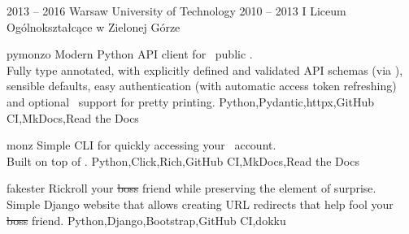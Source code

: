 \documentclass[localFont,alternative,10pt]{yaac-another-awesome-cv}
\begin{document}

  \begin{scholarship}
    \scholarshipentry
      {2013 – 2016}
      {Warsaw University of Technology}
    \scholarshipentry
      {2010 – 2013}
      {I Liceum Ogólnokształcące w Zielonej Górze}
  \end{scholarship}

  \vspace{0.5em}


  \begin{projects}
    \project
      {pymonzo}{}
      { }
      {
        Modern Python API client for ~public . \\
        Fully type annotated, with explicitly defined and validated API schemas (via ),
        sensible defaults, easy authentication (with automatic access token refreshing)
        and optional ~support for pretty printing.
      }
      {Python,Pydantic,httpx,GitHub CI,MkDocs,Read the Docs}

    \project
      {monz}{}
      { }
      {
        Simple CLI for quickly accessing your ~account. \\
        Built on top of .
      }
      {Python,Click,Rich,GitHub CI,MkDocs,Read the Docs}

    \project
      {fakester}{}
      { }
      {
        Rickroll your \sout{boss} friend while preserving the element of surprise. \\
        Simple Django website that allows creating URL redirects that help fool your \sout{boss} friend.
      }
      {Python,Django,Bootstrap,GitHub CI,dokku}
  \end{projects}
\end{document}
